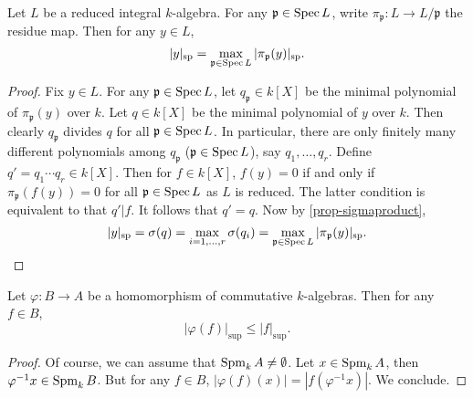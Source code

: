 \begin{proposition}\label{prop-spnormprimesred}
    Let $L$ be a reduced integral $k$-algebra. For any $\mathfrak{p}\in \operatorname{Spec} L$, write $\pi_{\mathfrak{p}}:L\rightarrow L/\mathfrak{p}$ the residue map. Then for any $y\in L$,
    \[
        |y|_{\mathrm{sp}}=\max_{\mathfrak{p}\in \operatorname{Spec} L}  |\pi_{\mathfrak{p}}(y)|_{\mathrm{sp}}.
    \]
\end{proposition}
\begin{proof}
    Fix $y\in L$.
    For any $\mathfrak{p}\in \operatorname{Spec} L$, let $q_{\mathfrak{p}}\in k[X]$ be the minimal polynomial of $\pi_{\mathfrak{p}}(y)$ over $k$. Let $q\in k[X]$ be the minimal polynomial of $y$ over $k$. Then clearly $q_{\mathfrak{p}}$ divides $q$ for all  $\mathfrak{p}\in \operatorname{Spec} L$. In particular, there are only finitely many different polynomials among $q_{\mathfrak{p}}$ ($\mathfrak{p}\in \operatorname{Spec} L$), say $q_1,\ldots,q_r$. Define $q'=q_1\cdots q_r\in k[X]$. Then for $f\in k[X]$, $f(y)=0$ if and only if $\pi_{\mathfrak{p}}(f(y))=0$ for all $\mathfrak{p}\in \operatorname{Spec} L$ as $L$ is reduced. The latter condition is equivalent to that $q'|f$. It follows that $q'=q$. Now by \cref{prop-sigmaproduct},
    \[
        |y|_{\mathrm{sp}}=\sigma(q)=\max_{i=1,\ldots,r}\sigma(q_i) =\max_{\mathfrak{p}\in \operatorname{Spec} L}  |\pi_{\mathfrak{p}}(y)|_{\mathrm{sp}}.
    \]
\end{proof}

\begin{proposition}\label{prop-supcontraction}
    Let $\varphi:B\rightarrow A$ be a homomorphism of commutative $k$-algebras. Then for any $f\in B$,
    \[
        |\varphi(f)|_{\sup}\leq |f|_{\sup}.  
    \]
\end{proposition}
\begin{proof}
    Of course, we can assume that $\operatorname{Spm}_k A\neq \emptyset$. Let $x\in \operatorname{Spm}_k A$, then $\varphi^{-1}x\in \operatorname{Spm}_k B$. But for any $f\in B$, $|\varphi(f)(x)|=|f(\varphi^{-1}x)|$. We conclude.
\end{proof}




